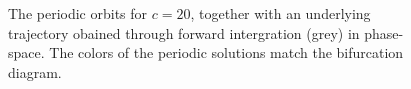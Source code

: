 \begin{figure}
\centering{}
\caption{The periodic orbits for $c=20$, together with an underlying trajectory obained through forward intergration (grey) in phase-space. The colors of the periodic solutions match the bifurcation diagram.}
\label{fig:roesslercut}
\end{figure}

\restoregeometry